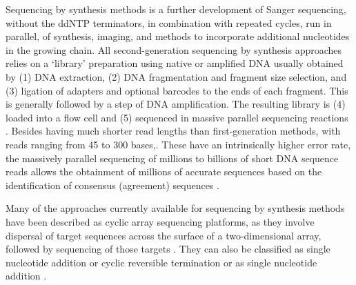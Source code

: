 Sequencing by synthesis methods is a further development of Sanger sequencing, without the \ac{ddNTP} terminators, in combination with repeated cycles, run in parallel, of synthesis, imaging, and methods to incorporate additional nucleotides in the growing chain. 
All second-generation sequencing by synthesis approaches relies on a ‘library’ preparation using native or amplified \ac{DNA} usually obtained by (1) \ac{DNA} extraction, (2) \ac{DNA} fragmentation and fragment size selection, and (3) ligation of adapters and optional barcodes to the ends of each fragment. 
This is generally followed by a step of \ac{DNA} amplification. The resulting library is (4) loaded into a flow cell and (5) sequenced in massive parallel sequencing reactions \citep{giani_long_2020}.
Besides having much shorter read lengths than first-generation methods, with reads ranging from 45 to 300 bases,. These have an intrinsically higher error rate, the massively parallel sequencing of millions to billions of short \ac{DNA} sequence reads allows the obtainment of millions of accurate sequences based on the identification of consensus (agreement) sequences \citep{slatko_overview_2018, goodwin_coming_2016, hagemann_overview_2015}. 

Many of the approaches currently available for sequencing by synthesis methods have been described as cyclic array sequencing platforms, as they involve dispersal of target sequences across the surface of a two-dimensional array, followed by sequencing of those targets \citep{hagemann_overview_2015}. 
They can also be classified as single nucleotide addition or cyclic reversible termination or as single nucleotide addition \citep{goodwin_coming_2016}. 

